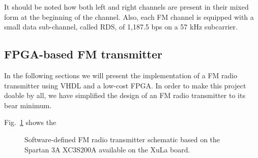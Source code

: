 \documentclass[13pt]{extreport}
\begin{document}
It should be noted how both left and right channels are present in their mixed form at the beginning of the channel. Also, each FM channel is equipped with a small data sub-channel, called RDS, of 1,187.5 bps on a 57 kHz subcarrier.

\subsection{FPGA-based FM transmitter}
In the following sections we will present the implementation of a FM radio transmitter using VHDL and a low-cost FPGA. In order to make this project doable by all, we have simplified the design of an FM radio transmitter to its bear minimum.

Fig.~\ref{sdr} shows the

\usetikzlibrary{circuits.ee.IEC} %
\begin{figure}
    \centering
{}
\caption{Software-defined FM radio transmitter schematic based on the Spartan 3A XC3S200A available on the XuLa board.}
\label{sdr}
\end{figure}













\end{document}
